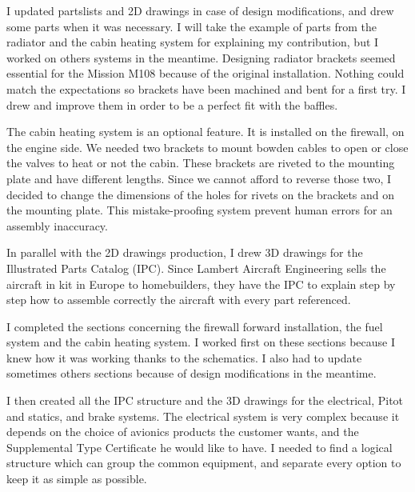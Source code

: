 \documentclass[11pt,a4paper]{report}
\begin{document}
\bigskip

I updated partslists and 2D drawings in case of design modifications, and drew some parts when it was necessary. I will take the example of parts from the radiator and the cabin heating system for explaining my contribution, but I worked on others systems in the meantime.
Designing radiator brackets seemed essential for the Mission M108 because of the original installation. Nothing could match the expectations so brackets have been machined and bent for a first try. I drew and improve them in order to be a perfect fit with the baffles.

\bigskip

The cabin heating system is an optional feature. It is installed on the firewall, on the engine side. We needed two brackets to mount bowden cables to open or close the valves to heat or not the cabin. These brackets are riveted to the mounting plate and have different lengths. Since we cannot afford to reverse those two, I decided to change the dimensions of the holes for rivets on the brackets and on the mounting plate. This mistake-proofing system prevent human errors for an assembly inaccuracy.

\bigskip

In parallel with the 2D drawings production, I drew 3D drawings for the Illustrated Parts Catalog (IPC). Since Lambert Aircraft Engineering sells the aircraft in kit in Europe to homebuilders, they have the IPC to explain step by step how to assemble correctly the aircraft with every part referenced.

\bigskip

I completed the sections concerning the firewall forward installation, the fuel system and the cabin heating system. I worked first on these sections because I knew how it was working thanks to the schematics. I also had to update sometimes others sections because of design modifications in the meantime.

\bigskip

I then created all the IPC structure and the 3D drawings for the electrical, Pitot and statics, and brake systems.
The electrical system is very complex because it depends on the choice of avionics products the customer wants, and the Supplemental Type Certificate he would like to have. I needed to find a logical structure which can group the common equipment, and separate every option to keep it as simple as possible.
\end{document}

